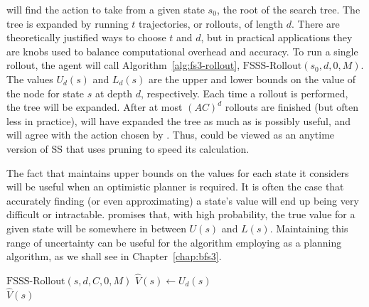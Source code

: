  will find the action to take from a given state $s_0$, the root of the search tree.  The tree is expanded by running $t$ trajectories, or rollouts, of length $d$. There are theoretically justified ways to choose $t$ and $d$, but in practical applications they are knobs used to balance computational overhead and accuracy. To run a single rollout, the agent will call Algorithm~\ref{alg:fs3-rollout}, $\mbox{FSSS-Rollout}(s_0, d, 0, M)$.
The values $U_d(s)$ and $L_d(s)$ are the upper and lower bounds on the value of the node for state $s$ at depth $d$, respectively. Each time a rollout is performed, the tree will be expanded. After at most $(AC)^d$ rollouts are finished (but often less in practice),  will have expanded the tree as much as is possibly useful, and will agree with the action chosen by . Thus,  could be viewed as an anytime version of SS that uses pruning to speed its calculation.

The fact that  maintains upper bounds on the values for each state it considers will be useful when an optimistic planner is required. It is often the case that accurately finding (or even approximating) a state's value will end up being very difficult or intractable.  promises that, with high probability, the true value for a given state will be somewhere in between $U(s)$ and $L(s)$. Maintaining this range of uncertainty can be useful for the algorithm employing  as a planning algorithm, as we shall see in Chapter~\ref{chap:bfs3}.

\begin{algorithm}[tb]
	\caption{$\mbox{FSSS}(s, d, C, t, M)$}
	\label{alg:fs3}

	 {
		$\mbox{FSSS-Rollout}(s, d, C, 0, M)$
	}
	$\hat V(s) \leftarrow U_d(s)$\\
	\Return $\hat V(s)$
\end{algorithm}

